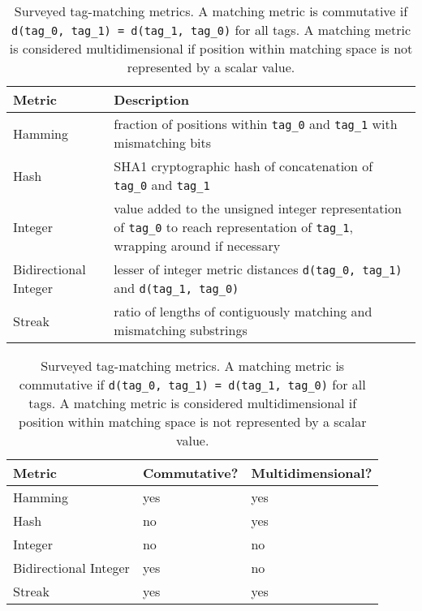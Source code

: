 \begin{table}[]
\begin{tabularx}{\textwidth}{l|X}
\textbf{Metric}       & \textbf{Description}                                                                                                                                        \\ \hline
Hamming               & fraction of positions within \texttt{tag\_0} and \texttt{tag\_1} with mismatching bits                                                                         \\ \hline
Hash                  & SHA1 cryptographic hash of  concatenation of \texttt{tag\_0} and \texttt{tag\_1} \citep{eastlake2001us}                         \\ \hline
Integer               & value added to the unsigned integer representation of \texttt{tag\_0} to reach representation of \texttt{tag\_1}, wrapping around if necessary \\ \hline
Bidirectional Integer & lesser of integer metric distances \texttt{d(tag\_0, tag\_1)} and \texttt{d(tag\_1, tag\_0)}                                                                \\ \hline
Streak                & ratio of lengths of contiguously matching and mismatching substrings \\ \hline
\end{tabularx}

\begin{tabularx}{\textwidth}{l|X|X}
\hline
\textbf{Metric}       & \textbf{Commutative?} & \textbf{Multidimensional?} \\ \hline
Hamming               & yes                   & yes                        \\ \hline
Hash                  & no                    & yes                        \\ \hline
Integer               & no                    & no                         \\ \hline
Bidirectional Integer & yes                   & no                         \\ \hline
Streak                & yes                   & yes                       
\end{tabularx}

\caption{
Surveyed tag-matching metrics. A matching metric is commutative if \texttt{d(tag\_0, tag\_1) = d(tag\_1, tag\_0)} for all tags.
A matching metric is considered multidimensional if position within matching space is not represented by a scalar value. 
}
\label{tab:metrics}

\end{table}

